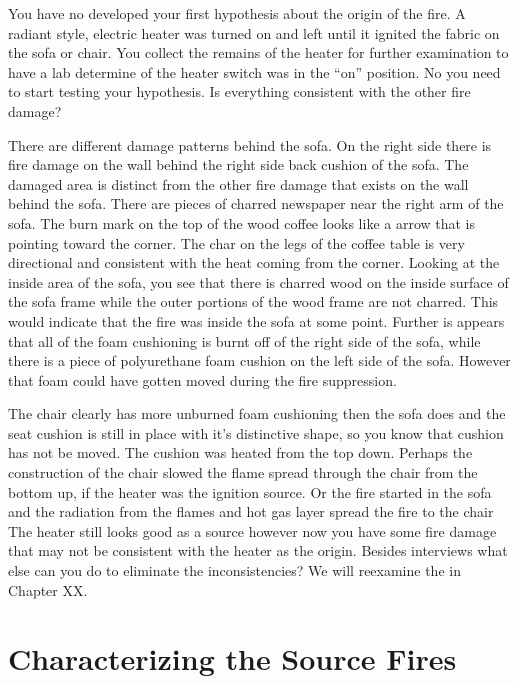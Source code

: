 \documentclass[twoside]{uocthesis}
\begin{document}
{You have no developed your first hypothesis about the origin of the fire.  A radiant style, electric heater was turned on and left until it ignited the fabric on the sofa or chair.  You collect the remains of the heater for further examination to have a lab determine of the heater switch was in the ``on'' position.  No you need to start testing your hypothesis.  Is everything consistent with the other fire damage?  

There are different damage patterns behind the sofa.  On the right side there is fire damage on the wall behind the right side back cushion of the sofa. The damaged area is distinct from the other fire damage that exists on the wall behind the sofa. There are pieces of charred newspaper near the right arm of the sofa.  The burn mark on the top of the wood coffee looks like a arrow that is pointing toward the corner.  The char on the legs of the coffee table is very directional and consistent with the heat coming from the corner.  Looking at the inside area of the sofa, you see that there is charred wood on the inside surface of the sofa frame while the outer portions of the wood frame are not charred.  This would indicate that the fire was inside the sofa at some point.  Further is appears that all of the foam cushioning is burnt off of the right side of the sofa, while there is a piece of polyurethane foam cushion on the left side of the sofa.  However that foam could have gotten moved during the fire suppression. 

The chair clearly has more unburned foam cushioning then the sofa does and the seat cushion is still in place with it's distinctive shape, so you know that cushion has not be moved.  The cushion was heated from the top down.  Perhaps the construction of the chair slowed the flame spread through the chair from the bottom up, if the heater was the ignition source.  Or the fire started in the sofa and the radiation from the flames and hot gas layer spread the fire to the chair  The heater still looks good as a source however now you have some fire damage that may not be consistent with the heater as the origin.  Besides interviews what else can you do to eliminate the inconsistencies?   We will reexamine the in Chapter XX.     

\chapter{Characterizing the Source Fires}
\label{chapter:Characterizing the Source Fires}

}
\end{document}
